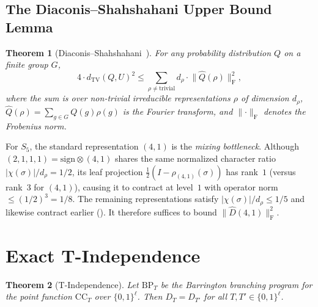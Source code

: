 \documentclass[11pt]{article}
\newtheorem{theorem}{Theorem}[section]
\newcommand{\norm}[1]{\lVert #1 \rVert}
\newcommand{\abs}[1]{\lvert #1 \rvert}
\newcommand{\frob}[1]{\norm{#1}_{\mathrm{F}}}
\newcommand{\dtv}{d_{\mathrm{TV}}}
\newcommand{\Dhat}{\widehat{D}}
\newcommand{\CC}{\mathrm{CC}}
\newcommand{\BP}{\mathrm{BP}}
\begin{document}
\subsection{The Diaconis--Shahshahani Upper Bound Lemma}

\begin{theorem}[Diaconis--Shahshahani~\cite{DS81}]
\label{thm:ds}
For any probability distribution $Q$ on a finite group $G$,
\[
4 \cdot \dtv(Q, U)^2 \leq \sum_{\rho \neq \mathrm{trivial}}
d_\rho \cdot \frob{\widehat{Q}(\rho)}^2,
\]
where the sum is over non-trivial irreducible representations $\rho$ of
dimension $d_\rho$, $\widehat{Q}(\rho) = \sum_{g \in G} Q(g) \rho(g)$ is the
Fourier transform, and $\frob{\cdot}$ denotes the Frobenius norm.
\end{theorem}

For $S_5$, the standard representation $(4,1)$ is the \emph{mixing
bottleneck}. Although $(2,1,1,1) = \mathrm{sign} \otimes (4,1)$ shares the
same normalized character ratio $\abs{\chi(\sigma)}/d_\rho = 1/2$, its leaf
projection $\frac{1}{2}(I - \rho_{(4,1)}(\sigma))$ has rank~$1$ (versus
rank~$3$ for $(4,1)$), causing it to contract at level~$1$ with operator
norm $\leq (1/2)^3 = 1/8$. The remaining representations satisfy
$\abs{\chi(\sigma)}/d_\rho \leq 1/5$ and likewise contract earlier
(). It therefore suffices to
bound $\frob{\Dhat(4,1)}^2$.


\section{Exact T-Independence}
\label{sec:t-indep}

\begin{theorem}[T-Independence]
\label{thm:t-indep}
Let $\BP_T$ be the Barrington branching program for the point function $\CC_T$
over $\{0,1\}^\ell$. Then $D_T = D_{T'}$ for all $T, T' \in \{0,1\}^\ell$.
\end{theorem}
\end{document}
